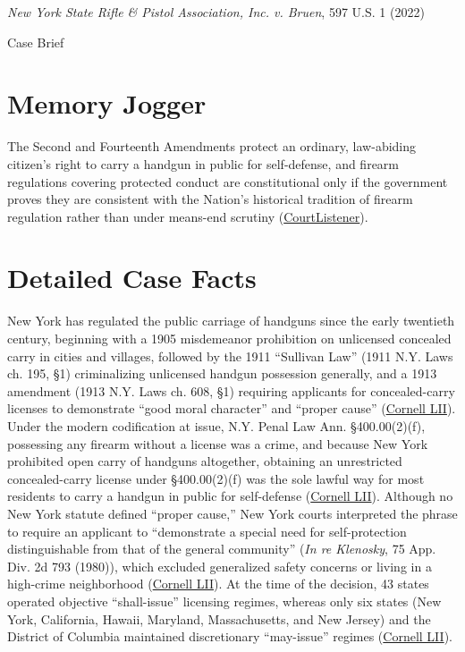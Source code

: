 \documentclass[12pt]{article}
\begin{document}
\begin{center}
{\LARGE \textit{New York State Rifle \& Pistol Association, Inc. v. Bruen}, 597 U.S. 1 (2022)\par}
\vspace{0.8em}
{\large Case Brief\par}
\end{center}
\vspace{1em}

\section{Memory Jogger}

The Second and Fourteenth Amendments protect an ordinary, law-abiding citizen's right to carry a handgun in public for self-defense, and firearm regulations covering protected conduct are constitutional only if the government proves they are consistent with the Nation's historical tradition of firearm regulation rather than under means-end scrutiny (\href{https://www.courtlistener.com/opinion/6480696/new-york-state-rifle-pistol-assn-inc-v-bruen/}{CourtListener}).

\section{Detailed Case Facts}

New York has regulated the public carriage of handguns since the early twentieth century, beginning with a 1905 misdemeanor prohibition on unlicensed concealed carry in cities and villages, followed by the 1911 ``Sullivan Law'' (1911 N.Y. Laws ch. 195, \S 1) criminalizing unlicensed handgun possession generally, and a 1913 amendment (1913 N.Y. Laws ch. 608, \S 1) requiring applicants for concealed-carry licenses to demonstrate ``good moral character'' and ``proper cause'' (\href{https://www.law.cornell.edu/supremecourt/text/20-843}{Cornell LII}). Under the modern codification at issue, N.Y. Penal Law Ann. \S 400.00(2)(f), possessing any firearm without a license was a crime, and because New York prohibited open carry of handguns altogether, obtaining an unrestricted concealed-carry license under \S 400.00(2)(f) was the sole lawful way for most residents to carry a handgun in public for self-defense (\href{https://www.law.cornell.edu/supremecourt/text/20-843}{Cornell LII}). Although no New York statute defined ``proper cause,'' New York courts interpreted the phrase to require an applicant to ``demonstrate a special need for self-protection distinguishable from that of the general community'' (\textit{In re Klenosky}, 75 App. Div. 2d 793 (1980)), which excluded generalized safety concerns or living in a high-crime neighborhood (\href{https://www.law.cornell.edu/supremecourt/text/20-843}{Cornell LII}). At the time of the decision, 43 states operated objective ``shall-issue'' licensing regimes, whereas only six states (New York, California, Hawaii, Maryland, Massachusetts, and New Jersey) and the District of Columbia maintained discretionary ``may-issue'' regimes (\href{https://www.law.cornell.edu/supremecourt/text/20-843}{Cornell LII}).
\end{document}
